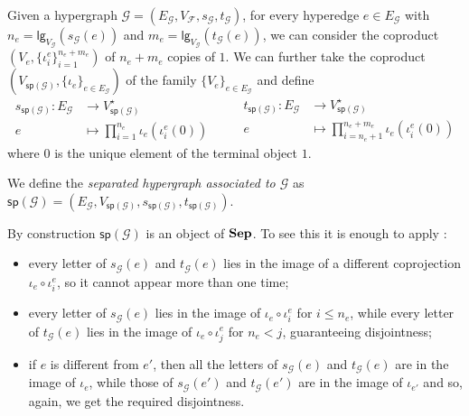 \documentclass[3p]{elsarticle}
\newcommand{\lgh}{\mathsf{lg}}
\newcommand{\catname}[1]{\textbf{\textup{#1}}}
\newcommand{\shyp}{\catname{Sep}}
\renewcommand{\sp}{\mathsf{sp}}
\theoremstyle{remark}
\theoremstyle{definition}
\begin{document}
\begin{defi}
Given a hypergraph $\mathcal{\mathcal{G}}=(E_{\mathcal{G}}, V_{\mathcal{F}}, s_{\mathcal{G}}, t_{\mathcal{G}})$, for every hyperedge $e\in E_{\mathcal{G}}$ with $n_e=\lgh_{V_{\mathcal{G}}}(s_{\mathcal{G}}(e))$ and $m_e=\lgh_{V_{\mathcal{G}}}(t_{\mathcal{G}}(e))$, we can consider the coproduct $(V_e, \{\iota^e_{i}\}_{i=1}^{n_e+m_e})$ of $n_e+m_e$ copies of $1$.
We can further take the coproduct $(V_{\sp(\mathcal{G})}, \{\iota_e\}_{e\in E_{\mathcal{G}}})$ of the family $\{V_{e}\}_{e\in E_\mathcal{G}}$ and define
\[\begin{split}
	s_{\sp(\mathcal{G})} \colon E_{\mathcal{G}}&\to V_{\sp(\mathcal{G})}^\star\\
	e &\mapsto \prod_{i=1}^{n_e} \iota_e(\iota^e_{i}(0))
\end{split}\qquad \begin{split}
	t_{\sp(\mathcal{G})} \colon E_{\mathcal{G}}&\to V_{\sp(\mathcal{G})}^\star\\
	e &\mapsto \prod_{i=n_e+1}^{n_e + m_e} \iota_e(\iota^e_{i}(0))
\end{split} \]
where $0$ is the unique element of the terminal object $1$. 

We define the \emph{separated hypergraph associated to $\mathcal{G}$}  as $\sp(\mathcal{G}) = (E_{\mathcal{G}}, V_{\sp(\mathcal{G})}, s_{\sp(\mathcal{G})}, t_{\sp(\mathcal{G})})$.
\end{defi}
\begin{rem}\label{rem:ob}
 By construction $\sp(\mathcal{G})$ is an object of $\shyp$. To see this it is enough to apply :
 \begin{itemize}
 	\item every letter of $s_{\mathcal{G}}(e)$ and $t_{\mathcal{G}}(e)$ lies in the image of a different coprojection $\iota_e\circ \iota^e_i$, so it cannot appear more than one time;
 	\item every letter of $s_{\mathcal{G}}(e)$ lies in the image of $\iota_{e}\circ \iota^e_i$  for $i\leq n_e$, while every letter of $t_{\mathcal{G}}(e)$ lies in the image of $\iota_{e}\circ \iota^e_j$  for $n_e < j$, guaranteeing disjointness;
 	\item if $e$ is different from $e'$, then all the letters of $s_{\mathcal{G}}(e)$ and $t_{\mathcal{G}}(e)$ are  in the image of $\iota_e$, while those of  $s_{\mathcal{G}}(e')$ and $t_{\mathcal{G}}(e')$ are in the image of $\iota_{e'}$ and so, again, we get the required disjointness. 
 \end{itemize}
\end{rem}
\end{document}

